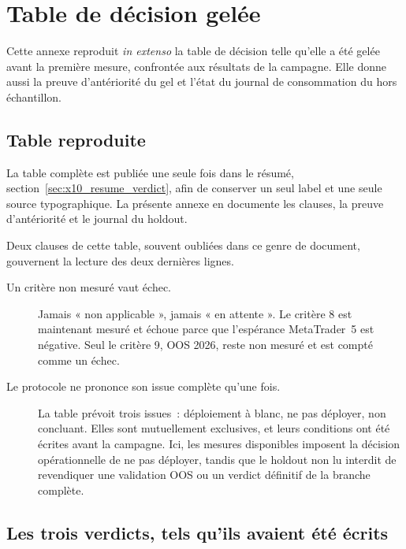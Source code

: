 \section{Table de décision gelée}
\label{app:x10_table_decision}

Cette annexe reproduit \emph{in extenso} la table de décision telle qu'elle a
été gelée avant la première mesure, confrontée aux résultats de la campagne.
Elle donne aussi la preuve d'antériorité du gel et l'état du journal de
consommation du hors échantillon.

\subsection{Table reproduite}

La table complète est publiée une seule fois dans le
résumé, section~\ref{sec:x10_resume_verdict}, afin de conserver un seul label
et une seule source typographique. La présente annexe en documente les clauses,
la preuve d'antériorité et le journal du holdout.

Deux clauses de cette table, souvent oubliées dans ce genre de document,
gouvernent la lecture des deux dernières lignes.

\begin{description}
  \item[Un critère non mesuré vaut échec.] Jamais « non applicable », jamais
  « en attente ». Le critère 8 est maintenant mesuré et échoue parce que
  l'espérance MetaTrader~5 est négative. Seul le critère 9, OOS 2026, reste
  non mesuré et est compté comme un échec.
  \item[Le protocole ne prononce son issue complète qu'une fois.] La table
  prévoit trois issues~: déploiement à blanc, ne pas déployer, non concluant.
  Elles sont mutuellement exclusives, et leurs conditions ont été écrites
  avant la campagne. Ici, les mesures disponibles imposent la décision
  opérationnelle de ne pas déployer, tandis que le holdout non lu interdit de
  revendiquer une validation OOS ou un verdict définitif de la branche
  complète.
\end{description}

\subsection{Les trois verdicts, tels qu'ils avaient été écrits}

